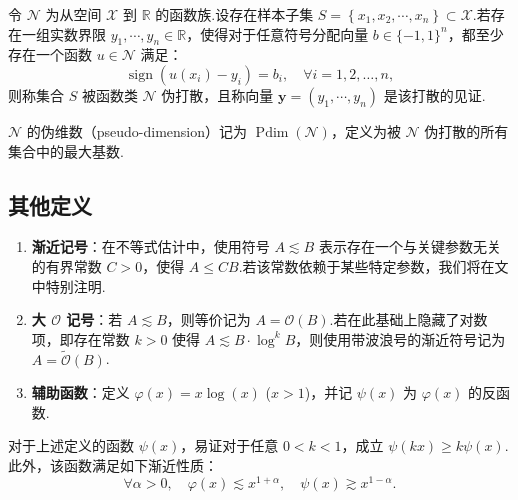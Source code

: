 \begin{definition}\label{def:staerr:pseshatter}
令 $\mathcal{N}$ 为从空间 $\mathcal{X}$ 到 $\mathbb{R}$ 的函数族.设存在样本子集 $S=\left\{x_{1}, x_{2}, \cdots, x_{n}\right\} \subset \mathcal{X}$.若存在一组实数界限 $y_{1}, \cdots, y_{n} \in \mathbb{R}$，使得对于任意符号分配向量 $b \in \{-1, 1\}^{n}$，都至少存在一个函数 $u \in \mathcal{N}$ 满足：
$$\operatorname{sign}\left(u(x_{i})-y_{i}\right)=b_{i}, \quad \forall i=1,2, \ldots, n,$$
则称集合 $S$ 被函数类 $\mathcal{N}$ 伪打散，且称向量 $\mathbf{y} = (y_{1}, \cdots, y_{n})$ 是该打散的见证.
\end{definition}

\begin{definition}\label{def:staerr:pdim}
$\mathcal{N}$ 的伪维数（pseudo-dimension）记为 $\operatorname{Pdim}(\mathcal{N})$，定义为被 $\mathcal{N}$ 伪打散的所有集合中的最大基数.
\end{definition}

\subsection{其他定义}
\begin{enumerate}
\item \textbf{渐近记号}：在不等式估计中，使用符号 $A \lesssim B$ 表示存在一个与关键参数无关的有界常数 $C>0$，使得 $A \leq CB$.若该常数依赖于某些特定参数，我们将在文中特别注明.
\item \textbf{大 $\mathcal{O}$ 记号}：若 $A \lesssim B$，则等价记为 $A = \mathcal{O}(B)$.若在此基础上隐藏了对数项，即存在常数 $k > 0$ 使得 $A \lesssim B \cdot \log^k B$，则使用带波浪号的渐近符号记为 $A = \widetilde{\mathcal{O}}(B)$.

\item \textbf{辅助函数}：定义 $\varphi(x) = x\log(x)$ ($x>1$)，并记 $\psi(x)$ 为 $\varphi(x)$ 的反函数.
\end{enumerate}
\begin{remark}
对于上述定义的函数 $\psi(x)$，易证对于任意 $0<k<1$，成立 $\psi(kx) \geq k\psi(x)$.此外，该函数满足如下渐近性质：
$$ \forall \alpha>0, \quad \varphi(x) \lesssim x^{1+\alpha}, \quad \psi(x) \gtrsim x^{1-\alpha}. $$
\end{remark}